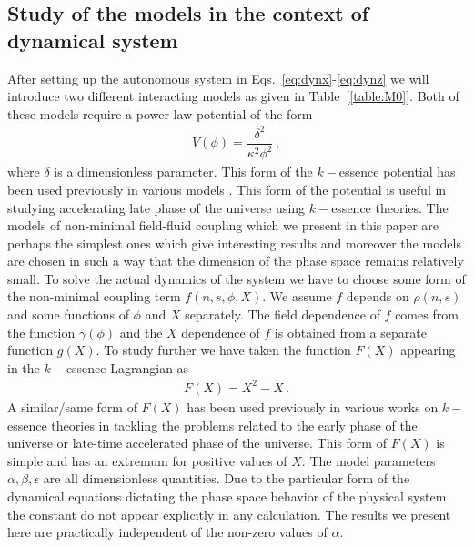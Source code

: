 \documentclass[a4paper,12pt]{article}
\begin{document}
\subsection{Study of the models in the context of dynamical system}

After setting up the autonomous system in  Eqs.~\eqref{eq:dynx}-\eqref{eq:dynz} we will introduce two different interacting models as given in Table~[\ref{table:M0}]. Both of these models require a power law potential of the form
\begin{eqnarray}
V(\phi) = \dfrac{\delta^2}{\kappa^2\phi^2}\,,
\label{plpot}
\end{eqnarray}
where $\delta$ is a dimensionless parameter. This form of the $k-$essence potential has been used previously in various models \cite{ArmendarizPicon:2000ah, Yang:2010vv}. This form of the potential is useful in studying accelerating late phase of the universe using $k-$essence theories. The models of non-minimal field-fluid coupling which we present in this paper are perhaps the simplest ones which give interesting results and moreover the models are chosen in such a way that the dimension of the phase space remains relatively small.  To solve the actual dynamics of the system we have to choose some form of the non-minimal coupling term $f(n,s,\phi, X)$. We assume $f$ depends on $\rho(n,s)$ and some functions of $\phi$ and $X$ separately. The field dependence of $f$ comes from the function $\gamma(\phi)$ and the $X$ dependence of $f$ is obtained from a separate function $g(X)$. To study further we have taken the function $F(X)$ appearing in the $k-$essence Lagrangian as
\begin{eqnarray}
F(X) = X^2 -X\,.
\label{Fform}  
\end{eqnarray}
A similar/same form of $F(X)$ has been used previously in various works on $k-$essence theories \cite{ArmendarizPicon:1999rj,Chiba:1999ka, Scherrer:2004au} in tackling the problems related to the early phase of the universe or late-time accelerated phase of the universe. This form of $F(X)$ is simple and has an extremum for positive values of $X$.
The model parameters $\alpha, \beta, \epsilon $ are all dimensionless quantities. Due to the particular form of the dynamical equations dictating the phase space behavior of the physical system the constant do not appear explicitly in any calculation. The results we present here are practically independent of the non-zero values of $\alpha$. 
\end{document}
